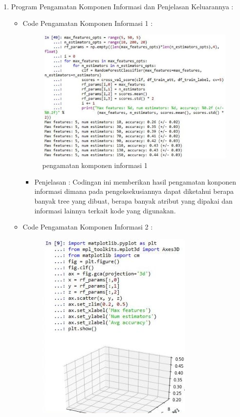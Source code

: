 \begin{enumerate}
\par
\par
\item Program Pengamatan Komponen Informasi dan Penjelasan Keluarannya :
\begin{itemize}
\item Code Pengamatan Komponen Informasi 1 :
\par
\begin{figure}[ht]
\centering
\includegraphics[scale=0.2]{figures/pe1.jpg}
\caption{pengamatan komponen informasi 1}
\label{contoh}
\end{figure}
\par
\begin{itemize}
\item Penjelasan : Codingan ini memberikan hasil pengamatan konponen informasi dimana pada pengeksekusiannya dapat diketahui berapa banyak tree yang dibuat, berapa banyak atribut yang dipakai dan informasi lainnya terkait kode yang digunakan.
\par 
\par
\end{itemize}
\item Code Pengamatan Komponen Informasi 2  :
\par
\begin{figure}[ht]
\centering
\includegraphics[scale=0.2]{figures/pe2.jpg}

\end{figure}
\end{itemize}
\end{enumerate}
